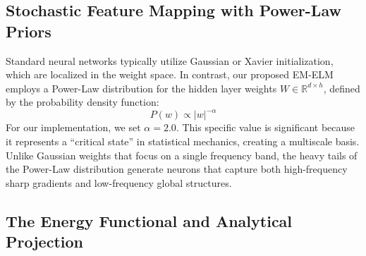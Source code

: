 \documentclass[final,12pt,3p,times,fleqn]{elsarticle}
\begin{document}
\subsection{Stochastic Feature Mapping with Power-Law Priors}

Standard neural networks typically utilize Gaussian or Xavier initialization, which are localized in the weight space. In contrast, our proposed EM-ELM employs a Power-Law distribution for the hidden layer weights $W \in \mathbb{R}^{d \times h}$, defined by the probability density function:
$$P(w) \propto |w|^{-\alpha}$$
For our implementation, we set $\alpha=2.0$. This specific value is significant because it represents a ``critical state'' in statistical mechanics, creating a multiscale basis. Unlike Gaussian weights that focus on a single frequency band, the heavy tails of the Power-Law distribution generate neurons that capture both high-frequency sharp gradients and low-frequency global structures.

\bigskip
\noindent{}
\bigskip


\subsection{The Energy Functional and Analytical Projection}
\end{document}
